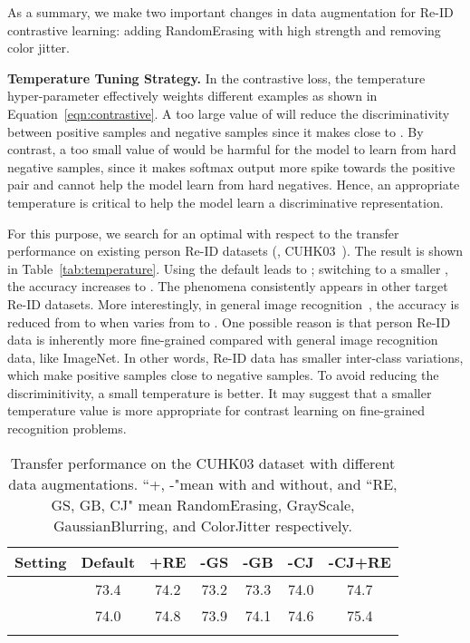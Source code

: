 \documentclass[final]{cvpr}
\newcommand{\Tref}[1]{Table~\ref{#1}}
\begin{document}
As a summary, we make two important changes in data augmentation for Re-ID contrastive learning: adding RandomErasing with high strength and removing color jitter. 

\vspace{0.5em}
\noindent\textbf{Temperature Tuning Strategy.}
In the contrastive loss, the temperature hyper-parameter  effectively weights different examples as shown in Equation~\ref{eqn:contrastive}. A too large value of  will reduce the discriminativity between positive samples  and negative samples  since it makes  close to . By contrast, a too small value of  would be harmful for the model to learn from hard negative samples, since it makes softmax output more spike towards the positive pair and cannot help the model learn from hard negatives. Hence, an appropriate temperature is critical to help the model learn a discriminative representation.

For this purpose, we search for an optimal  with respect to the transfer performance on existing person Re-ID datasets (\eg, CUHK03~\cite{li2014deepreid}). The result is shown in \Tref{tab:temperature}. Using the default  leads to ; switching to a smaller , the accuracy increases to  . The phenomena consistently appears in other target Re-ID datasets. More interestingly, in general image recognition~\cite{chen2020improved}, the accuracy is reduced from  to  when  varies from  to . One possible reason is that person Re-ID data is inherently more fine-grained compared with general image recognition data, like ImageNet. In other words, Re-ID data has smaller inter-class variations, which make positive samples close to negative samples. To avoid reducing the discriminitivity, a small temperature is better. It may suggest that a smaller temperature value is more appropriate for contrast learning on fine-grained recognition problems. 


\begin{table}[t]
\setlength{\tabcolsep}{2.3mm}
\centering
\small
\begin{tabular}{c|cccccc}
    \shline
    Setting & Default & +RE & -GS & -GB & -CJ & -CJ+RE\\
    \hline
      & 73.4 & 74.2 & 73.2 & 73.3 & 74.0 & 74.7 \\
    \hline
     & 74.0 & 74.8 & 73.9 & 74.1 & 74.6 & 75.4 \\
	 \shline
\end{tabular}
\caption{Transfer performance on the CUHK03 dataset with different data augmentations. ``+, -"mean with and without, and ``RE, GS, GB, CJ" mean RandomErasing, GrayScale, GaussianBlurring, and ColorJitter respectively.}
\label{table:augmentation}
\end{table}
\end{document}
